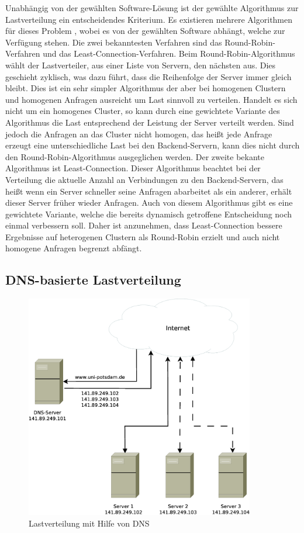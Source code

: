 \documentclass[a4paper, 12pt, BCOR10mm, DIV12, toc=bibliography, toc=listof, german]{scrbook}
\begin{document}
			Unabhängig von der gewählten Software-Lösung ist der gewählte Algorithmus zur Lastverteilung
			ein entscheidendes Kriterium. Es existieren mehrere Algorithmen für dieses Problem
			\cite{zinke2007}, wobei es von der gewählten Software abhängt, welche zur Verfügung stehen.
			Die zwei bekanntesten Verfahren sind das Round-Robin-Verfahren und das
			Least-Connection-Verfahren. Beim Round-Robin-Algorithmus wählt der Lastverteiler, aus einer
			Liste von Servern, den nächsten aus. Dies geschieht zyklisch, was dazu führt, dass die
			Reihenfolge der Server immer gleich bleibt. Dies ist ein sehr simpler Algorithmus der aber bei
			homogenen Clustern und homogenen Anfragen ausreicht um Last sinnvoll zu verteilen. Handelt es
			sich nicht um ein homogenes Cluster, so kann durch eine gewichtete Variante des Algorithmus
			die Last entsprechend der Leistung der Server verteilt werden. Sind jedoch die Anfragen an das
			Cluster nicht homogen, das heißt jede Anfrage erzeugt eine unterschiedliche Last bei den
			Backend-Servern, kann dies nicht durch den Round-Robin-Algorithmus ausgeglichen werden. Der
			zweite bekante Algorithmus ist Least-Connection. Dieser Algorithmus beachtet bei der
			Verteilung die aktuelle Anzahl an Verbindungen zu den Backend-Servern, das heißt wenn ein
			Server schneller seine Anfragen abarbeitet als ein anderer, erhält dieser Server früher wieder
			Anfragen. Auch von diesem Algorithmus gibt es eine gewichtete Variante, welche die bereits
			dynamisch getroffene Entscheidung noch einmal verbessern soll. Daher ist anzunehmen, dass
			Least-Connection bessere Ergebnisse auf heterogenen Clustern als Round-Robin erzielt und auch
			nicht homogene Anfragen begrenzt abfängt.


			\subsection*{DNS-basierte Lastverteilung} %

			\begin{figure}
				\centering
				\includegraphics[width=10cm]{images/dns-loadbalancer}
				\caption{Lastverteilung mit Hilfe von DNS}
				\label{fig:lastverteilung-dns}
			\end{figure}
\end{document}
